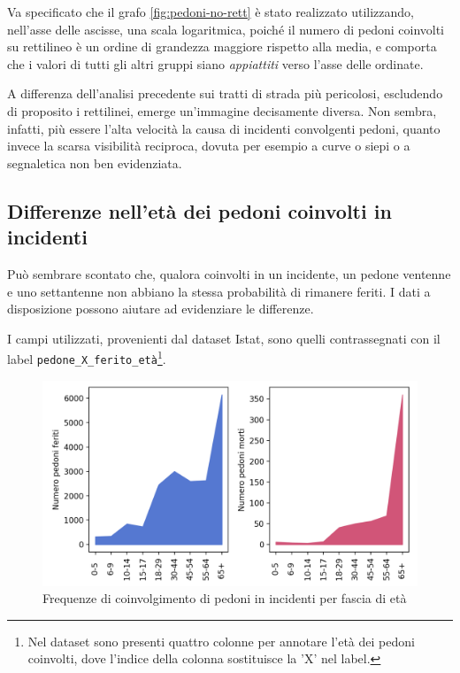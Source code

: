 \documentclass[a4paper,12pt]{report}
\newcommand{\columnstyle}[1]{\texttt{#1}}
\newcommand{\quotestyle}[1]{\textit{#1}}
\begin{document}
Va specificato che il grafo \ref{fig:pedoni-no-rett} è stato realizzato utilizzando, 
nell'asse delle ascisse, una scala logaritmica, poiché il numero di pedoni coinvolti 
su rettilineo è un ordine di grandezza maggiore rispetto alla media, e 
comporta che i valori di tutti gli altri gruppi siano \quotestyle{appiattiti} 
verso l'asse delle ordinate. 

A differenza dell'analisi precedente sui tratti di strada più pericolosi, 
escludendo di proposito i rettilinei, emerge un'immagine decisamente diversa. 
Non sembra, infatti, più essere l'alta velocità la causa di incidenti convolgenti pedoni, 
quanto invece la scarsa visibilità reciproca, dovuta per esempio a curve o siepi o a 
segnaletica non ben evidenziata.

\subsection{Differenze nell'età dei pedoni coinvolti in incidenti}

Può sembrare scontato che, qualora coinvolti in un incidente, un pedone ventenne e 
uno settantenne non abbiano la stessa probabilità di rimanere feriti. 
I dati a disposizione possono aiutare ad evidenziare le differenze.

I campi utilizzati, provenienti dal dataset Istat, sono quelli contrassegnati 
con il label 
\columnstyle{pedone\_X\_ferito\_età}\footnote{Nel dataset sono presenti quattro colonne per 
annotare l'età dei pedoni coinvolti, dove l'indice della colonna sostituisce la 'X' nel label.}. 

\begin{figure}
    \includegraphics[width=\linewidth]{../src/incidenti/incidenti_senza_coords/pedoni/eta_pedoni_iniziale.png}
    \caption{Frequenze di coinvolgimento di pedoni in incidenti per fascia di età}
    \label{fig:eta-pedoni-iniziale}
\end{figure}
\end{document}
